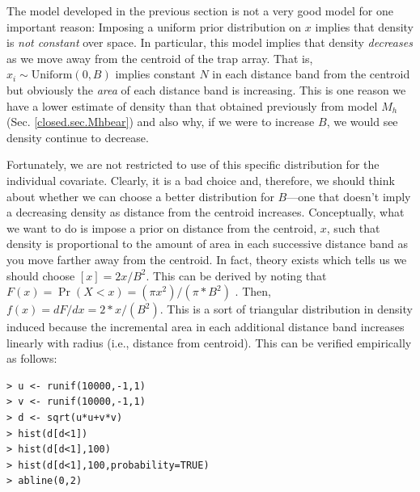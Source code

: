 The model developed in the previous section is not a very good model
for one important reason: Imposing a uniform prior distribution on $x$
implies that density is {\it not constant} over space. In particular,
this model implies that density {\it decreases} as we move away from the
centroid of the trap array.  That is, $x_{i} \sim \mbox{Uniform}(0,B)$
implies constant $N$ in each distance band from the centroid but
obviously the {\it area} of each distance band is increasing.  This is
one reason we have a lower estimate of density than that obtained
previously from model $M_h$ (Sec. \ref{closed.sec.Mhbear}) and also
why, if we were to increase $B$, we would see density continue to
decrease.

Fortunately, we are not
restricted to use of this specific distribution for the individual
covariate. Clearly, it is a bad choice and, therefore, we should think
about whether we can choose a better distribution for $B$---one that
doesn't imply a decreasing density as distance from the centroid
increases.  Conceptually, what we want to do is impose a prior on
distance from the centroid, $x$, such that density is proportional to
the amount of area in each successive distance band as you move
farther away from the centroid.  In fact, theory exists which tells us
we should choose $[x] = 2x/B^2$. This can be derived
by noting that $F(x) = \Pr(X<x) = (\pi x^2)/(\pi*B^{2})$ . Then, $f(x)
= dF/dx = 2*x/(B^{2})$. This is a sort of triangular distribution in
density induced because the incremental area in each additional
distance band increases linearly with radius (i.e., distance from
centroid). This can be verified empirically as follows:
{\small
\begin{verbatim}
> u <- runif(10000,-1,1)
> v <- runif(10000,-1,1)
> d <- sqrt(u*u+v*v)
> hist(d[d<1])
> hist(d[d<1],100)
> hist(d[d<1],100,probability=TRUE)
> abline(0,2)
\end{verbatim}
}

